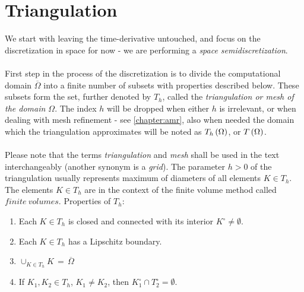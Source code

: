 \section{Triangulation}
\label{section:triangulation}
We start with leaving the time-derivative untouched, and focus on the discretization in space for now - we are performing a \textit{space semidiscretization}.
\paragraph{}
First step in the process of the discretization is to divide the computational domain $\overline{\Omega}$ into a finite number of subsets with properties described below. These subsets form the set, further denoted by $T_h$, called the \textit{triangulation or mesh of the domain $\Omega$}. The index $h$ will be dropped when either $h$ is irrelevant, or when dealing with mesh refinement - see \cref{chapter:amr}, also when needed the domain which the triangulation approximates will be noted as $T_h\left(\Omega\right)$, or $T\left(\Omega\right)$.
\paragraph{}
Please note that the terms \textit{triangulation} and \textit{mesh} shall be used in the text interchangeably (another synonym is a \textit{grid}). The parameter $h>0$ of the triangulation usually represents maximum of diameters of all elements $K\in T_h$. The elements $K\in T_h$ are in the context of the finite volume method called $finite\ volumes$.
\newpage
Properties of $T_h$:
\begin{enumerate}
    \item Each $K\in T_h$ is closed and connected with its interior $K^{\circ}\neq\emptyset$.
    \item Each $K\in T_h$ has a Lipschitz boundary.
    \item$\cup_{K\in T_h}K\,=\,\overline{\Omega}$
    \item If $K_1,K_2\in T_h$, $K_1\neq{K_2}$, then $K_1^{\circ}\cap{T}_2^{\circ} = \emptyset$.
\end{enumerate}
